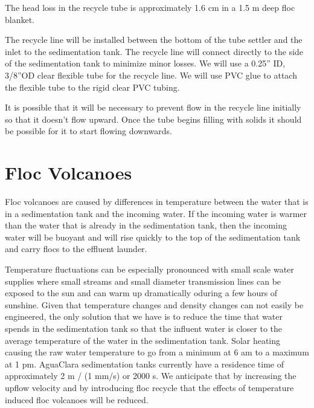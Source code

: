 \documentclass[letterpaper,10pt,english]{sphinxmanual}
\begin{document}
{The head loss in the recycle tube is approximately 1.6 cm in a 1.5 m deep floc blanket.

The recycle line will be installed between the bottom of the tube settler and the inlet to the sedimentation tank. The recycle line will connect  directly to the side of the sedimentation tank to minimize minor losses. We will use a 0.25” ID, 3/8”OD clear flexible tube for the recycle line. We will use PVC glue to attach the flexible tube to the rigid clear PVC tubing.

It is possible that it will be necessary to prevent flow in the recycle line initially so that it doesn’t flow upward. Once the tube begins filling with solids it should be possible for it to start flowing downwards.


\section{Floc Volcanoes}
\label{\detokenize{Sedimentation/Sed_Theory_and_Future_Work:floc-volcanoes}}\label{\detokenize{Sedimentation/Sed_Theory_and_Future_Work:id3}}
Floc volcanoes are caused by differences in temperature between the water that is in a sedimentation tank and the incoming water. If the incoming water is warmer than the water that is already in the sedimentation tank, then the incoming water will be buoyant and will rise quickly to the top of the sedimentation tank and carry flocs to the effluent launder.

Temperature fluctuations can be especially pronounced with small scale water supplies where small streams and small diameter transmission lines can be exposed to the sun and can warm up dramatically oduring a few hours of sunshine. Given that temperature changes and density changes can not easily be engineered, the only solution that we have is to reduce the time that water spends in the sedimentation tank so that the influent water is closer to the average temperature of the water in the sedimentation tank. Solar heating causing the raw water temperature to go from a minimum at 6 am to a maximum at 1 pm. AguaClara sedimentation tanks currently have a residence time of approximately 2 m / (1 mm/s) or 2000 s. We anticipate that by increasing the upflow velocity and by introducing floc recycle that the effects of temperature induced floc volcanoes will be reduced.


}
\end{document}
